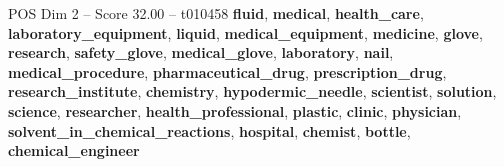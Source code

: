 \begin{textsample}{POS Dim 2 – Score 32.00 – t010458}  \label{ex:f2_pos_005}
\textbf{fluid}, \textbf{medical}, \textbf{health\_care}, \textbf{laboratory\_equipment}, \textbf{liquid}, \textbf{medical\_equipment}, \textbf{medicine}, \textbf{glove}, \textbf{research}, \textbf{safety\_glove}, \textbf{medical\_glove}, \textbf{laboratory}, \textbf{nail}, \textbf{medical\_procedure}, \textbf{pharmaceutical\_drug}, \textbf{prescription\_drug}, \textbf{research\_institute}, \textbf{chemistry}, \textbf{hypodermic\_needle}, \textbf{scientist}, \textbf{solution}, \textbf{science}, \textbf{researcher}, \textbf{health\_professional}, \textbf{plastic}, \textbf{clinic}, \textbf{physician}, \textbf{solvent\_in\_chemical\_reactions}, \textbf{hospital}, \textbf{chemist}, \textbf{bottle}, \textbf{chemical\_engineer}

\end{textsample}
